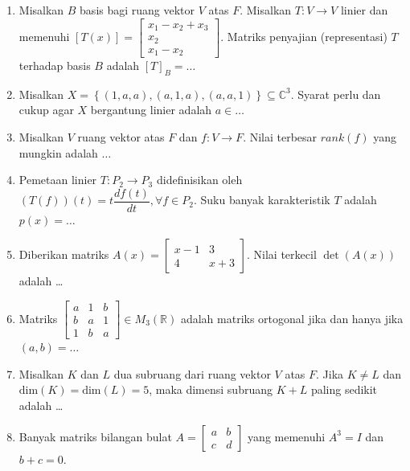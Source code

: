 \documentclass[12pt,twoside]{article}
\begin{document}
\begin{enumerate}
	\item Misalkan $B$ basis bagi ruang vektor $V$ atas $F$. Misalkan $T:V\to V$ linier dan memenuhi $\left[T(x)\right]=\left[\begin{array}{c}
				      x_1-x_2+x_3 \\x_2\\x_1-x_2\end{array}\right]$. Matriks penyajian (representasi) $T$ terhadap basis $B$ adalah $\left[T\right]_B=\dots$
	\item Misalkan $X=\left\lbrace(1,a,a),(a,1,a),(a,a,1)\right\rbrace\subseteq \mathbb{C}^3$. Syarat perlu dan cukup agar $X$ bergantung linier adalah $a\in \dots$

	\item Misalkan $V$ ruang vektor atas $F$ dan $f:V\to F$. Nilai terbesar $rank(f)$ yang mungkin adalah $\dots $

	\item Pemetaan linier $T:P_2\to P_3$ didefinisikan oleh $(T(f))(t)=t\dfrac{df(t)}{dt},\forall f\in P_2$. Suku banyak karakteristik $T$ adalah $p(x)=\dots$

	\item Diberikan matriks $A(x)=\begin{bmatrix}
			      x-1 & 3 \\4&x+3
		      \end{bmatrix}$. Nilai terkecil $\det(A(x))$ adalah \dots

	\item Matriks $\left[\begin{array}{lll}
				      a & 1 & b \\b&a&1\\1&b&a
			      \end{array}\right]\in M_3(\mathbb{R})$  adalah matriks ortogonal jika dan hanya jika $(a,b)=\dots$

	\item Misalkan $K$ dan $L$ dua subruang dari ruang vektor $V$ atas $F$. Jika $K\neq L$ dan $\text{dim}(K)=\text{dim}(L)=5$, maka dimensi subruang $K+L$ paling sedikit adalah \dots

	\item Banyak matriks bilangan bulat $A=\begin{bmatrix}
			      a & b \\c&d
		      \end{bmatrix}$ yang memenuhi $A^3=I$ dan $b+c=0$.
\end{enumerate}
\newpage
\end{document}
